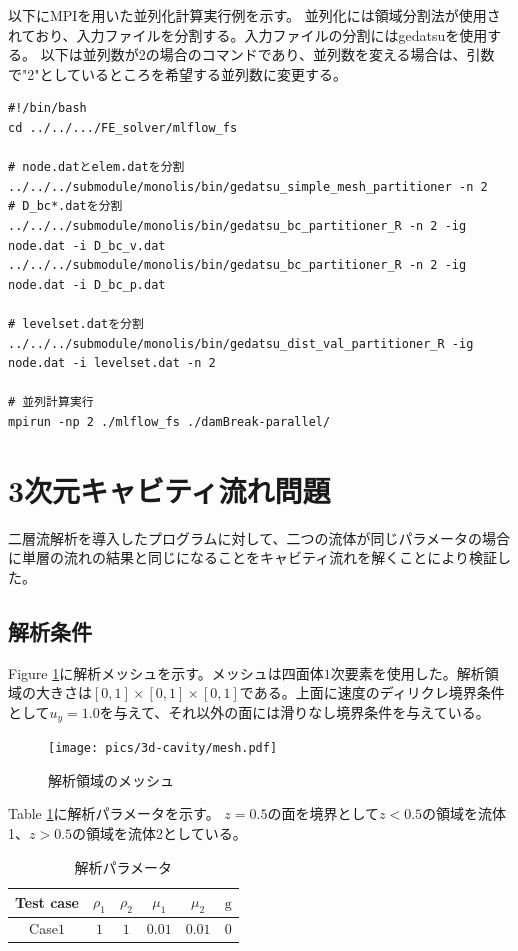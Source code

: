 \documentclass[8pt,a4paper]{article}
\begin{document}
以下にMPIを用いた並列化計算実行例を示す。
並列化には領域分割法が使用されており、入力ファイルを分割する。入力ファイルの分割にはgedatsuを使用する。
以下は並列数が2の場合のコマンドであり、並列数を変える場合は、引数で"2"としているところを希望する並列数に変更する。

\begin{lstlisting}[]
#!/bin/bash
cd ../../.../FE_solver/mlflow_fs

# node.datとelem.datを分割
../../../submodule/monolis/bin/gedatsu_simple_mesh_partitioner -n 2
# D_bc*.datを分割
../../../submodule/monolis/bin/gedatsu_bc_partitioner_R -n 2 -ig node.dat -i D_bc_v.dat
../../../submodule/monolis/bin/gedatsu_bc_partitioner_R -n 2 -ig node.dat -i D_bc_p.dat

# levelset.datを分割
../../../submodule/monolis/bin/gedatsu_dist_val_partitioner_R -ig node.dat -i levelset.dat -n 2

# 並列計算実行
mpirun -np 2 ./mlflow_fs ./damBreak-parallel/

\end{lstlisting}

\newpage
\section{3次元キャビティ流れ問題}
二層流解析を導入したプログラムに対して、二つの流体が同じパラメータの場合に単層の流れの結果と同じになることをキャビティ流れを解くことにより検証した。

\subsection{解析条件}
Figure \ref{fig:3d-cavity-mesh}に解析メッシュを示す。メッシュは四面体$1$次要素を使用した。解析領域の大きさは$[0, 1]\times[0,1]\times[0,1]$である。上面に速度のディリクレ境界条件として$u_{y}=1.0$を与えて、それ以外の面には滑りなし境界条件を与えている。
\begin{figure}[H]
	\centering
	\texttt{[image: pics/3d-cavity/mesh.pdf]}
	\caption{解析領域のメッシュ}
	\label{fig:3d-cavity-mesh}
\end{figure}

Table \ref{table:fluid-ml-cavity-parameter}に解析パラメータを示す。
$z=0.5$の面を境界として$z<0.5$の領域を流体1、$z>0.5$の領域を流体2としている。
\renewcommand{\arraystretch}{1}
\begin{table}[H]
	\centering
	\caption{解析パラメータ}
	\begin{tabular}{cccccc}
		\hline
		Test case & $\rho_1$ & $\rho_2$ & $\mu_1$ & $\mu_2$ & $\mathrm{g}$\\
		\hline 
		Case$1$ & $1$ & $1$ & $0.01$ & $0.01$   & $0$ \\
		\hline         
	\end{tabular}
	\label{table:fluid-ml-cavity-parameter}
\end{table}
\renewcommand{\arraystretch}{1.0}
\end{document}
